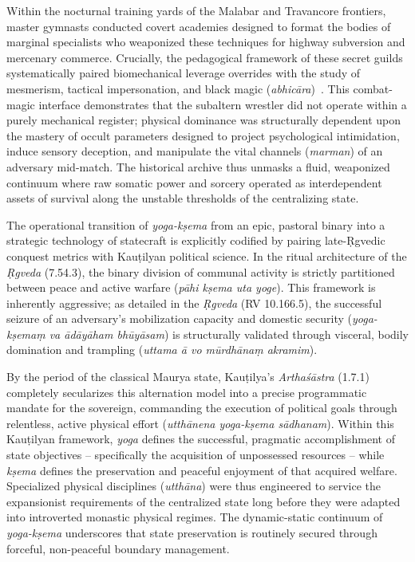 \documentclass[11pt,twoside,letterpaper]{article}
\begin{document}
Within the nocturnal training yards of the Malabar and Travancore frontiers, master gymnasts conducted covert academies designed to format the bodies of marginal specialists who weaponized these techniques for highway subversion and mercenary commerce. Crucially, the pedagogical framework of these secret guilds systematically paired biomechanical leverage overrides with the study of mesmerism, tactical impersonation, and black magic (\textit{abhicāra})~\cite{vilanilam1971}. This combat-magic interface demonstrates that the subaltern wrestler did not operate within a purely mechanical register; physical dominance was structurally dependent upon the mastery of occult parameters designed to project psychological intimidation, induce sensory deception, and manipulate the vital channels (\textit{marman}) of an adversary mid-match. The historical archive thus unmasks a fluid, weaponized continuum where raw somatic power and sorcery operated as interdependent assets of survival along the unstable thresholds of the centralizing state.

The operational transition of \textit{yoga-kṣema} from an epic, pastoral binary into a strategic technology of statecraft is explicitly codified by pairing late-Ṛgvedic conquest metrics with Kauṭilyan political science. In the ritual architecture of the \textit{Ṛgveda} (7.54.3), the binary division of communal activity is strictly partitioned between peace and active warfare (\textit{pāhi kṣema uta yoge}). This framework is inherently aggressive; as detailed in the \textit{Ṛgveda} (RV 10.166.5), the successful seizure of an adversary’s mobilization capacity and domestic security (\textit{yoga-kṣemaṃ va ādāyāham bhūyāsam}) is structurally validated through visceral, bodily domination and trampling (\textit{uttama ā vo mūrdhānaṃ akramim}). 

By the period of the classical Maurya state, Kauṭilya’s \textit{Arthaśāstra} (1.7.1) completely secularizes this alternation model into a precise programmatic mandate for the sovereign, commanding the execution of political goals through relentless, active physical effort (\textit{utthānena yoga-kṣema sādhanam}). Within this Kauṭilyan framework, \textit{yoga} defines the successful, pragmatic accomplishment of state objectives -- specifically the acquisition of unpossessed resources -- while \textit{kṣema} defines the preservation and peaceful enjoyment of that acquired welfare. Specialized physical disciplines (\textit{utthāna}) were thus engineered to service the expansionist requirements of the centralized state long before they were adapted into introverted monastic physical regimes. The dynamic-static continuum of \textit{yoga-kṣema} underscores that state preservation is routinely secured through forceful, non-peaceful boundary management.
\end{document}
